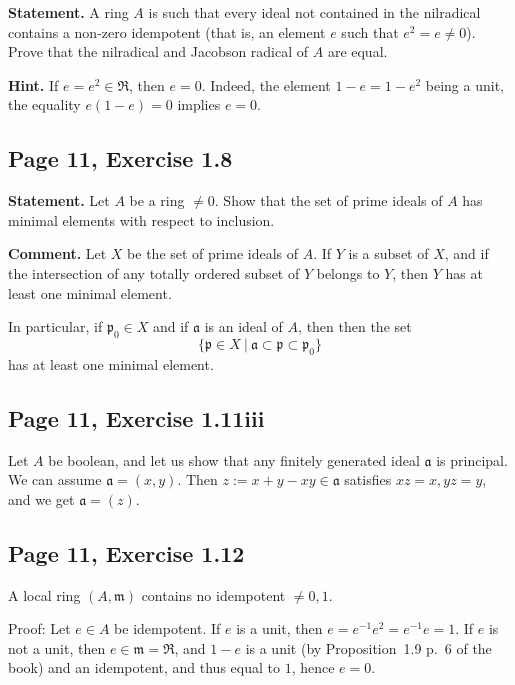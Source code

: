 \documentclass[parskip=half,fontsize=12pt]{scrartcl}%
\newcommand{\mf}{\mathfrak}
\newcommand{\aaa}{\mf a}
\newcommand{\mmm}{\mf m}
\newcommand{\ppp}{\mf p}
\begin{document}
\textbf{Statement.} A ring $A$ is such that every ideal not contained in the nilradical contains a non-zero idempotent (that is, an element $e$ such that $e^2=e\ne0$). Prove that the nilradical and Jacobson radical of $A$ are equal.

\textbf{Hint.} If $e=e^2\in\mf R$, then $e=0$. Indeed, the element $1-e=1-e^2$ being a unit, the equality $e(1-e)=0$ implies $e=0$.

\subsection{Page 11, Exercise 1.8}\label{vp1}%

\textbf{Statement.} Let $A$ be a ring $\ne0$. Show that the set of prime ideals of $A$ has minimal elements with respect to inclusion.

\textbf{Comment.} Let $X$ be the set of prime ideals of $A$. If $Y$ is a subset of $X$, and if the intersection of any totally ordered subset of $Y$ belongs to $Y$, then $Y$ has at least one minimal element.

In particular, if $\ppp_0\in X$ and if $\aaa$ is an ideal of $A$, then then the set 
$$
\{\ppp\in X\ |\ \aaa\subset\ppp\subset\ppp_0\}
$$ 
has at least one minimal element.

\subsection{Page 11, Exercise 1.11iii}\label{1.11iii}%

Let $A$ be boolean, and let us show that any finitely generated ideal $\aaa$ is principal. We can assume $\aaa=(x,y)$. Then $z:=x+y-xy\in\aaa$ satisfies $xz=x,yz=y$, and we get $\aaa=(z)$.

\subsection{Page 11, Exercise 1.12}\label{112}%

A local ring $(A,\mmm)$ contains no idempotent $\neq0,1$. %

Proof: Let $e\in A$ be idempotent. If $e$ is a unit, then $e=e^{-1}e^2=e^{-1}e=1$. If $e$ is not a unit, then $e\in\mmm=\mf R$, and $1-e$ is a unit (by Proposition~1.9 p.~6 of the book) and an idempotent, and thus equal to $1$, hence $e=0$.
\end{document}

